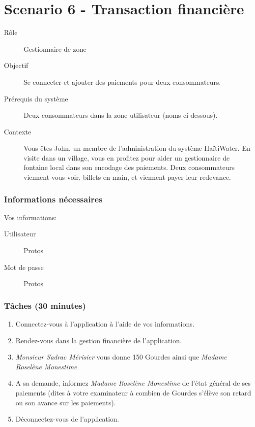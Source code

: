 \documentclass[a4paper, 11pt]{article}
\begin{document}
\newpage

\section*{Scenario 6 - Transaction financière}
    \begin{description}
        \item[Rôle] Gestionnaire de zone
        \item[Objectif] Se connecter et ajouter des paiements pour deux consommateurs.
        \item[Prérequis du système] Deux consommateurs dans la zone utilisateur (noms ci-dessous).
        \item[Contexte] Vous êtes John, un membre de l'administration du système HaïtiWater. En visite dans un village, vous en profitez pour aider un gestionnaire de fontaine local dans son encodage des paiements. Deux consommateurs viennent vous voir, billets en main, et viennent payer leur redevance.
    \end{description}

    \subsubsection*{Informations nécessaires}
    Vos informations:
    \begin{description}
        \item[Utilisateur] Protos
        \item[Mot de passe] Protos
    \end{description}

    \subsubsection*{Tâches (30 minutes)}
        \begin{enumerate}
            \item Connectez-vous à l'application à l'aide de vos informations.
            \item Rendez-vous dans la gestion financière de l'application.
            \item \emph{Monsieur Sadrac Mérisier} vous donne 150 Gourdes ainsi que \emph{Madame Roselène Monestime}
            \item A sa demande, informez \emph{Madame Roselène Monestime} de l'état général de ses paiements (dites à votre examinateur à combien de Gourdes s'élève son retard ou son avance sur les paiements).
            \item Déconnectez-vous de l'application.
        \end{enumerate}
\end{document}
